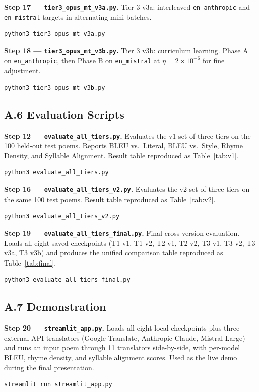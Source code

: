 \documentclass[11pt]{article}
\begin{document}
\textbf{Step 17 --- \texttt{tier3\_opus\_mt\_v3a.py}.} Tier 3 v3a: interleaved \texttt{en\_anthropic} and \texttt{en\_mistral} targets in alternating mini-batches.
\begin{lstlisting}[language=bash]
python3 tier3_opus_mt_v3a.py
\end{lstlisting}

\textbf{Step 18 --- \texttt{tier3\_opus\_mt\_v3b.py}.} Tier 3 v3b: curriculum learning. Phase A on \texttt{en\_anthropic}, then Phase B on \texttt{en\_mistral} at $\eta{=}2{\times}10^{-6}$ for fine adjustment.
\begin{lstlisting}[language=bash]
python3 tier3_opus_mt_v3b.py
\end{lstlisting}

\subsection*{A.6 Evaluation Scripts}

\textbf{Step 12 --- \texttt{evaluate\_all\_tiers.py}.} Evaluates the v1 set of three tiers on the 100 held-out test poems. Reports BLEU vs.~Literal, BLEU vs.~Style, Rhyme Density, and Syllable Alignment. Result table reproduced as Table~\ref{tab:v1}.
\begin{lstlisting}[language=bash]
python3 evaluate_all_tiers.py
\end{lstlisting}

\textbf{Step 16 --- \texttt{evaluate\_all\_tiers\_v2.py}.} Evaluates the v2 set of three tiers on the same 100 test poems. Result table reproduced as Table~\ref{tab:v2}.
\begin{lstlisting}[language=bash]
python3 evaluate_all_tiers_v2.py
\end{lstlisting}

\textbf{Step 19 --- \texttt{evaluate\_all\_tiers\_final.py}.} Final cross-version evaluation. Loads all eight saved checkpoints (T1 v1, T1 v2, T2 v1, T2 v2, T3 v1, T3 v2, T3 v3a, T3 v3b) and produces the unified comparison table reproduced as Table~\ref{tab:final}.
\begin{lstlisting}[language=bash]
python3 evaluate_all_tiers_final.py
\end{lstlisting}

\subsection*{A.7 Demonstration}

\textbf{Step 20 --- \texttt{streamlit\_app.py}.} Loads all eight local checkpoints plus three external API translators (Google Translate, Anthropic Claude, Mistral Large) and runs an input poem through 11 translators side-by-side, with per-model BLEU, rhyme density, and syllable alignment scores. Used as the live demo during the final presentation.
\begin{lstlisting}[language=bash]
streamlit run streamlit_app.py
\end{lstlisting}
\end{document}
